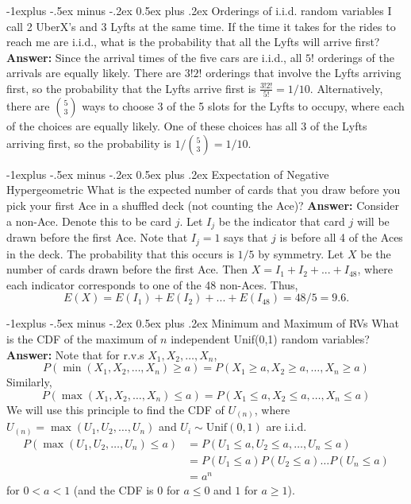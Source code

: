 \documentclass[10pt,landscape]{article}
\makeatletter
\newcommand{\Unif}{\textrm{Unif}}
\renewcommand{\subsection}{\@startsection{subsection}{2}{0mm}%
                                {-1explus -.5ex minus -.2ex}%
                                {0.5ex plus .2ex}%
                                {\normalfont\normalsize\bfseries}}
\makeatother
\begin{document}
\begin{multicols*}{3}
	\subsection{Orderings of i.i.d. random variables}
	I call 2 UberX's and 3 Lyfts at the same time. If the time it takes for the rides to reach me are i.i.d., what is the probability that all the Lyfts will arrive first? \textbf{Answer:} Since the arrival times of the five cars are i.i.d., all $5!$ orderings of the arrivals are equally likely. There are $3!2!$ orderings that involve the Lyfts arriving first, so the probability that the Lyfts arrive first is $\boxed{\frac{3!2!}{5!} = 1/10}$. Alternatively, there are ${5 \choose 3}$ ways to choose 3 of the 5 slots for the Lyfts to occupy, where each of the choices are equally likely. One of these choices has all 3 of the Lyfts arriving first, so the probability is $\boxed{1 / {5 \choose 3} = 1/10}$.
									
	\subsection{Expectation of Negative Hypergeometric}
	What is the expected number of cards that you draw before you pick your first Ace in a shuffled deck (not counting the Ace)?
	\textbf{Answer:} Consider a non-Ace. Denote this to be card $j$. Let $I_j$ be the indicator that card $j$ will be drawn before the first Ace. Note that $I_j=1$ says that  $j$ is before all 4 of the Aces in the deck. The probability that this occurs is $1/5$ by symmetry. Let $X$ be the number of cards drawn before the first Ace. Then $X = I_1 + I_2 + ... + I_{48}$, where each indicator corresponds to one of the 48 non-Aces. Thus, \[E(X) = E(I_1) + E(I_2) + ... + E(I_{48}) = 48/5 = \boxed{9.6}.\]
									
	\subsection{Minimum and Maximum of RVs}
	What is the CDF of the maximum of $n$ independent Unif(0,1) random variables? \textbf{Answer:} Note that for r.v.s $X_1,X_2,\dots,X_n$, 
	\[ P(\min(X_1, X_2, \dots, X_n) \geq a) = P(X_1 \geq a, X_2 \geq a, \dots, X_n \geq a) \] Similarly, \[ P(\max(X_1, X_2, \dots, X_n) \leq a) = P(X_1 \leq a, X_2 \leq a, \dots, X_n \leq a) \] We will use this principle to find the CDF of $U_{(n)}$, where $U_{(n)} = \max(U_1, U_2, \dots, U_n)$ and $U_i \sim \Unif(0, 1)$ are i.i.d.
	\begin{align*}
		P(\max(U_1, U_2, \dots, U_n) \leq a)
		  & = P(U_1 \leq a, U_2 \leq a, \dots, U_n \leq a)  \\
		  & = P(U_1 \leq a)P(U_2 \leq a)\dots P(U_n \leq a) \\
		  & = \boxed{a^n}                                   
	\end{align*}
	for $0<a<1$ (and the CDF is $0$ for $a \leq 0$ and $1$ for $a \geq 1$).
									

\end{multicols*}
\end{document}
